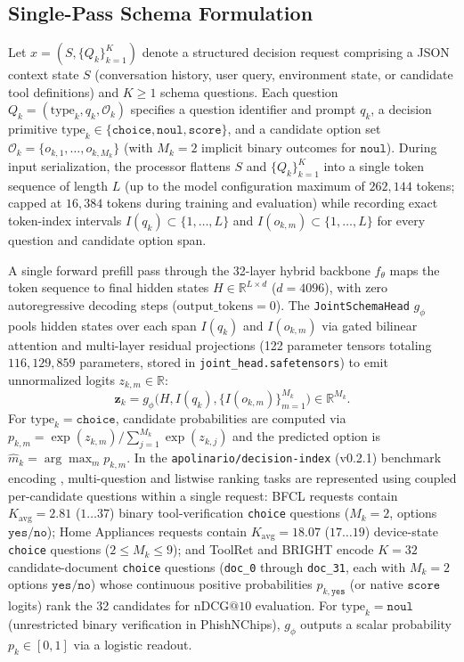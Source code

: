 \documentclass[10pt,twocolumn]{article}
\begin{document}
\subsection{Single-Pass Schema Formulation}
Let $x = (S, \{Q_k\}_{k=1}^K)$ denote a structured decision request comprising a JSON context state $S$ (conversation history, user query, environment state, or candidate tool definitions) and $K \ge 1$ schema questions. Each question $Q_k = (\text{type}_k, q_k, \mathcal{O}_k)$ specifies a question identifier and prompt $q_k$, a decision primitive $\text{type}_k \in \{\texttt{choice}, \texttt{noul}, \texttt{score}\}$, and a candidate option set $\mathcal{O}_k = \{o_{k,1}, \dots, o_{k,M_k}\}$ (with $M_k = 2$ implicit binary outcomes for $\texttt{noul}$). During input serialization, the processor flattens $S$ and $\{Q_k\}_{k=1}^K$ into a single token sequence of length $L$ (up to the model configuration maximum of $262{,}144$ tokens; capped at $16{,}384$ tokens during training and evaluation) while recording exact token-index intervals $I(q_k) \subset \{1,\dots,L\}$ and $I(o_{k,m}) \subset \{1,\dots,L\}$ for every question and candidate option span.

A single forward prefill pass through the 32-layer hybrid backbone $f_\theta$ maps the token sequence to final hidden states $H \in \mathbb{R}^{L \times d}$ ($d = 4096$), with zero autoregressive decoding steps ($\text{output\_tokens} = 0$). The \texttt{JointSchemaHead} $g_\phi$ pools hidden states over each span $I(q_k)$ and $I(o_{k,m})$ via gated bilinear attention and multi-layer residual projections (122 parameter tensors totaling $116{,}129{,}859$ parameters, stored in \texttt{joint\_head.safetensors}) to emit unnormalized logits $z_{k,m} \in \mathbb{R}$:
\begin{equation}
    \mathbf{z}_k = g_\phi\big(H, I(q_k), \{I(o_{k,m})\}_{m=1}^{M_k}\big) \in \mathbb{R}^{M_k}.
    \label{eq:head_forward}
\end{equation}
For $\text{type}_k = \texttt{choice}$, candidate probabilities are computed via $p_{k,m} = \exp(z_{k,m}) / \sum_{j=1}^{M_k} \exp(z_{k,j})$ and the predicted option is $\hat{m}_k = \arg\max_m p_{k,m}$. In the \texttt{apolinario/decision-index} (v0.2.1) benchmark encoding \citep{apolinario2026decisionindex}, multi-question and listwise ranking tasks are represented using coupled per-candidate questions within a single request: BFCL requests contain $K_{\text{avg}} = 2.81$ ($1\dots 37$) binary tool-verification \texttt{choice} questions ($M_k = 2$, options $\texttt{yes}/\texttt{no}$); Home Appliances requests contain $K_{\text{avg}} = 18.07$ ($17\dots 19$) device-state \texttt{choice} questions ($2 \le M_k \le 9$); and ToolRet and BRIGHT encode $K = 32$ candidate-document \texttt{choice} questions (\texttt{doc\_0} through \texttt{doc\_31}, each with $M_k = 2$ options $\texttt{yes}/\texttt{no}$) whose continuous positive probabilities $p_{k,\texttt{yes}}$ (or native $\texttt{score}$ logits) rank the 32 candidates for $\text{nDCG@10}$ evaluation. For $\text{type}_k = \texttt{noul}$ (unrestricted binary verification in PhishNChips), $g_\phi$ outputs a scalar probability $p_k \in [0, 1]$ via a logistic readout.
\end{document}
